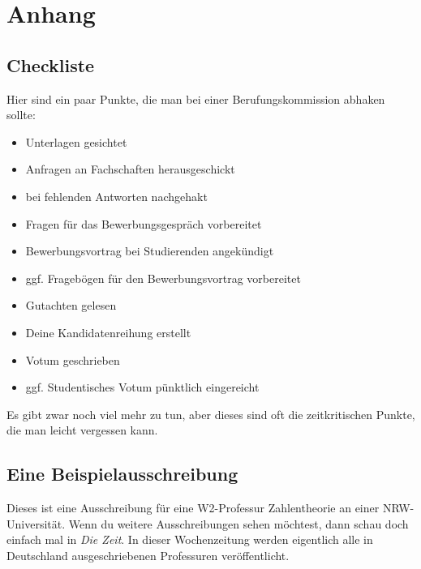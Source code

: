 \documentclass[10pt,twoside,a5paper,openright]{book}
\begin{document}
\appendix
\chapter{Anhang}\thispagestyle{fancy}

\section{Checkliste}
Hier sind ein paar Punkte, die man bei einer Berufungskommission abhaken sollte:
\begin{itemize}
	\item [\Square] Unterlagen gesichtet
	\item [\Square] Anfragen an Fachschaften herausgeschickt
	\item [\Square] bei fehlenden Antworten nachgehakt
	\item [\Square] Fragen für das Bewerbungsgespräch vorbereitet
	\item [\Square] Bewerbungsvortrag bei Studierenden angekündigt
	\item [\Square] ggf. Fragebögen für den Bewerbungsvortrag vorbereitet
	\item [\Square] Gutachten gelesen
	\item [\Square] Deine Kandidatenreihung erstellt
	\item [\Square] Votum geschrieben
	\item [\Square] ggf. Studentisches Votum pünktlich eingereicht
\end{itemize}
Es gibt zwar noch viel mehr zu tun, aber dieses sind oft die zeitkritischen Punkte, die man leicht vergessen kann.


\section{Eine Beispielausschreibung}
Dieses ist eine Ausschreibung für eine W2-Professur Zahlentheorie an einer NRW-Universität. Wenn du weitere Ausschreibungen sehen möchtest, dann schau doch einfach mal in \emph{Die Zeit}.  In dieser Wochenzeitung werden eigentlich alle in Deutschland ausgeschriebenen Professuren veröffentlicht.\bigskip 
\end{document}

